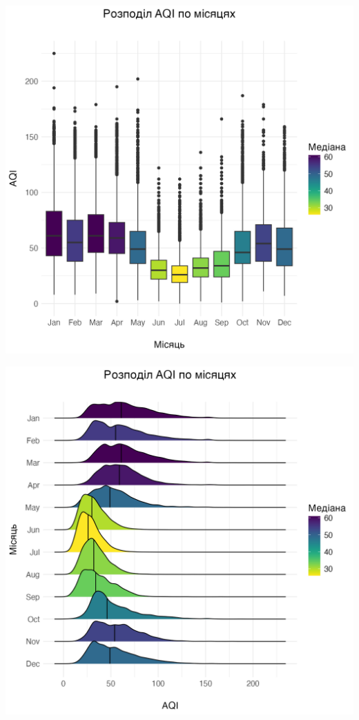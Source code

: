 \documentclass[./report.tex]{subfiles}
\begin{document}
\begin{enumerate}
  \includegraphics[width=\linewidth]{plots/question4/seasonal_change.png}

  \includegraphics[width=\linewidth]{plots/question4/seasonal_change_ridgeline.png}


\end{enumerate}
\end{document}

